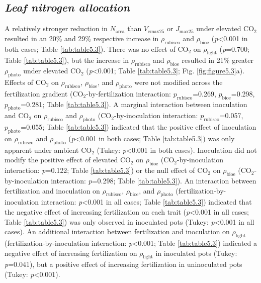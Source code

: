 \subsection{\textit{Leaf nitrogen allocation}}
\noindent A relatively stronger reduction in $N_\mathrm{area}$ than $V_\mathrm{cmax25}$ or $J_\mathrm{max25}$ under elevated CO$_2$ resulted in an 20\% and 29\% respective increase in $\rho_\mathrm{rubisco}$ and $\rho_\mathrm{bioe}$ (\textit{p}<0.001 in both cases; Table \ref{tab:table5.3}). There was no effect of CO$_2$ on $\rho_\mathrm{light}$ (\textit{p}=0.700; Table \ref{tab:table5.3}), but the increase in $\rho_\mathrm{rubisco}$ and $\rho_\mathrm{bioe}$ resulted in 21\% greater $\rho_\mathrm{photo}$ under elevated CO$_2$ (\textit{p}<0.001; Table \ref{tab:table5.3}; Fig. \ref{fig:figure5.3}a). Effects of CO$_2$ on $\rho_\mathrm{rubisco}$, $\rho_\mathrm{bioe}$, and $\rho_\mathrm{photo}$ were not modified across the fertilization gradient (CO$_2$-by-fertilization interaction: $p_\mathrm{rubisco}$=0.269, $p_\mathrm{bioe}$=0.298, $p_\mathrm{photo}$=0.281; Table \ref{tab:table5.3}). A marginal interaction between inoculation and CO$_2$ on $\rho_\mathrm{rubisco}$ and $\rho_\mathrm{photo}$ (CO$_2$-by-inoculation interaction: $p_\mathrm{rubisco}$=0.057, $p_\mathrm{photo}$=0.055; Table \ref{tab:table5.3}) indicated that the  positive effect of inoculation on $\rho_\mathrm{rubisco}$ and $\rho_\mathrm{photo}$ (\textit{p}<0.001 in both cases; Table \ref{tab:table5.3}) was only apparent under ambient CO$_2$ (Tukey: \textit{p}<0.001 in both cases). Inoculation did not modify the positive effect of elevated CO$_2$ on $\rho_\mathrm{bioe}$ (CO$_2$-by-inoculation interaction: \textit{p}=0.122; Table \ref{tab:table5.3}) or the null effect of CO$_2$ on $\rho_\mathrm{bioe}$ (CO$_2$-by-inoculation interaction: \textit{p}=0.298; Table \ref{tab:table5.3}). An interaction between fertilization and inoculation on $\rho_\mathrm{rubisco}$, $\rho_\mathrm{bioe}$, and $\rho_\mathrm{photo}$ (fertilization-by-inoculation interaction: \textit{p}<0.001 in all cases; Table \ref{tab:table5.3}) indicated that the negative effect of increasing fertilization on each trait (\textit{p}<0.001 in all cases; Table \ref{tab:table5.3}) was only observed in inoculated pots (Tukey: \textit{p}<0.001 in all cases). An additional interaction between fertilization and inoculation on $\rho_\mathrm{light}$ (fertilization-by-inoculation interaction: \textit{p}<0.001; Table \ref{tab:table5.3}) indicated a negative effect of increasing fertilization on $\rho_\mathrm{light}$ in inoculated pots (Tukey: \textit{p}=0.041), but a positive effect of increasing fertilization in uninoculated pots (Tukey: \textit{p}<0.001).

